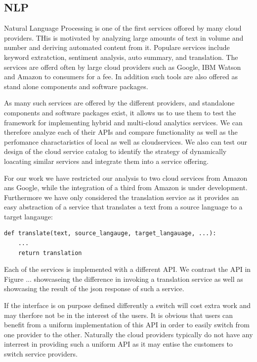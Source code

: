 
\subsection{NLP}


Natural Language Processing is one of the first services offored by
many cloud providers. THis is motivated by analyzing large amounts of
text in volume and number and deriving automated content from
it. Populare services include keyword extratction, sentiment analysis,
auto summary, and translation.  The services are offerd often by large
cloud providers such as Google, IBM Watson and Amazon to consumers for
a fee. In addition such tools are also offered as stand alone
components and software packages.

As many such services are offered by the different providers, and
standalone components and software packages exist, it allows us to use
them to test the framework for implementing hybrid and multi-cloud
analytics services. We can therefore analyze each of their APIs and
compare functionality as well as the perfomance charactaristics of
local as well as cloudservices. We also can test our design of the
cloud service catalog to identify the strategy of dynamically
loacating similar services and integrate them into a service offering.

For our work we have restricted our analysis to two cloud services
from Amazon ans Google, while the integration of a third from Amazon
is under development. Furthermore we have only considered the
translation service as it provides an easy abstraction of a service
that translates a text from a source language to a target langauge:

\begin{Verbatim}[fontsize=\small]
def translate(text, source_langauge, target_langauage, ...):
    ...
    return translation
\end{Verbatim}

Each of the services is implemented with a different API. We contrast
the API in Figure ... showcaseing the difference in invoking a
translation service as well as showcasing the result of the json
response of such a service.


If the interface is on purpose defined differently a switch will cost
extra work and may therfore not be in the interest of the users.  It
is obvious that users can benefit from a uniform implementation of
this API in order to easily switch from one provider to the other.
Naturally the cloud providers typically do not have any interrest in
providing such a uniform API as it may entise the customers to switch
service providers.


